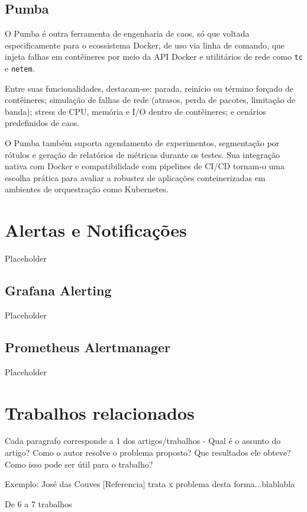 \subsection{Pumba}
\label{subsection:Pumba}

{\color{red}

O Pumba \citep{pumba2025} é outra ferramenta de engenharia de caos, só que voltada especificamente para o ecossistema Docker, de uso via linha de comando, que injeta falhas em contêineres por meio da API Docker e utilitários de rede como \texttt{tc} e \texttt{netem}.

Entre suas funcionalidades, destacam-se: parada, reinício ou término forçado de contêineres; simulação de falhas de rede (atrasos, perda de pacotes, limitação de banda); stress de CPU, memória e I/O dentro de contêineres; e cenários predefinidos de caos.

O Pumba também suporta agendamento de experimentos, segmentação por rótulos e geração de relatórios de métricas durante os testes. Sua integração nativa com Docker e compatibilidade com pipelines de CI/CD tornam-o uma escolha prática para avaliar a robustez de aplicações conteinerizadas em ambientes de orquestração como Kubernetes.
    

}

\section{Alertas e Notificações}
\label{section:AlertasNotificacoes}

Placeholder

\subsection{Grafana Alerting}
\label{subsection:GrafanaAlerting}

Placeholder

\subsection{Prometheus Alertmanager}
\label{subsection:PrometheusAlertmanager}

Placeholder

\section{Trabalhos relacionados}
\label{section:TrabalhosRelacionados}

Cada paragrafo corresponde a 1 dos artigos/trabalhos - Qual é o assunto do artigo? Como o autor resolve o problema proposto? Que resultados ele obteve? Como isso pode ser útil para o trabalho?

Exemplo: José das Couves [Referencia] trata x problema desta forma...blablabla

De 6 a 7 trabalhos